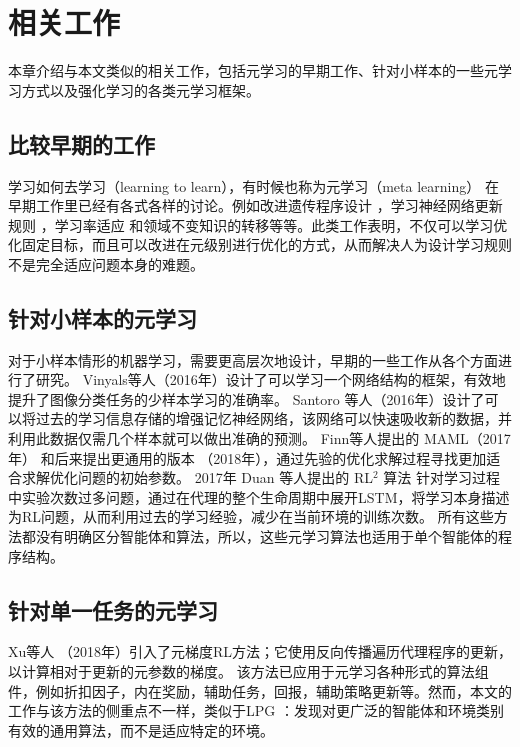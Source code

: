 \chapter{相关工作}
\label{cha:sysu-thesis-latex-install-guide}

本章介绍与本文类似的相关工作，包括元学习的早期工作、针对小样本的一些元学习方式以及强化学习的各类元学习框架。


\section{比较早期的工作}
学习如何去学习（learning to learn），有时候也称为元学习（meta learning）\cite{MetaLearningComputer2021} 在早期工作里已经有各式各样的讨论。例如改进遗传程序设计\cite{ohDiscoveringReinforcementLearning2020} \cite{schmidhuberEvolutionaryPrinciplesSelfreferential1987}，学习神经网络更新规则 \cite{bengioLearningSynapticLearning1990}，学习率适应 \cite{suttonAdaptingBiasGradient1992} 和领域不变知识的转移\cite{thrunLearningOneMore1994}等等。此类工作表明，不仅可以学习优化固定目标，而且可以改进在元级别进行优化的方式，从而解决人为设计学习规则不是完全适应问题本身的难题。


\section{针对小样本的元学习}
对于小样本情形的机器学习，需要更高层次地设计，早期的一些工作从各个方面进行了研究。
Vinyals等人\cite{vinyalsMatchingNetworksOne2016b}（2016年）设计了可以学习一个网络结构的框架，有效地提升了图像分类任务的少样本学习的准确率。
Santoro 等人\cite{santoroMetaLearningMemoryAugmentedNeural2016}（2016年）设计了可以将过去的学习信息存储的增强记忆神经网络，该网络可以快速吸收新的数据，并利用此数据仅需几个样本就可以做出准确的预测。
Finn等人提出的 MAML（2017年）\cite{finnModelagnosticMetalearningFast2017} 和后来提出更通用的版本 \cite{finnMetaLearningUniversalityDeep2018}（2018年），通过先验的优化求解过程寻找更加适合求解优化问题的初始参数。
2017年 Duan 等人提出的 RL$^2$ 算法 \cite{duanRLFastReinforcement2016} 针对学习过程中实验次数过多问题，通过在代理的整个生命周期中展开LSTM，将学习本身描述为RL问题，从而利用过去的学习经验，减少在当前环境的训练次数。
所有这些方法都没有明确区分智能体和算法，所以，这些元学习算法也适用于单个智能体的程序结构。

\section{针对单一任务的元学习}
Xu等人\cite{xuMetagradientReinforcementLearning2018} （2018年）引入了元梯度RL方法；它使用反向传播遍历代理程序的更新，以计算相对于更新的元参数的梯度。
该方法已应用于元学习各种形式的算法组件，例如折扣因子，内在奖励，辅助任务，回报，辅助策略更新等\cite{ohDiscoveringReinforcementLearning2020}。然而，本文的工作与该方法的侧重点不一样，类似于LPG \cite{ohDiscoveringReinforcementLearning2020}：发现对更广泛的智能体和环境类别有效的通用算法，而不是适应特定的环境。

